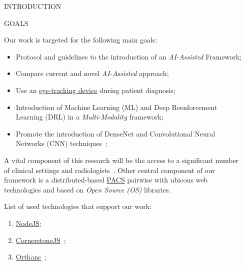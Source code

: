 \documentclass[final]{beamer}
\begin{document}
\begin{frame}[t, fragile = singleslide]{}
\begin{columns}[t]
\begin{column}{0.45\textwidth}
\begin{block}{INTRODUCTION}
\end{block}

\begin{block}{GOALS}

Our work is targeted for the following main goals:

\begin{itemize}
\item Protocol and guidelines to the introduction of an {\it AI-Assisted} Framework;
\item Compare current and novel {\it AI-Assisted} approach;
\item Use an \hyperlink{https://gaming.tobii.com/products/}{eye-tracking device} during patient diagnosis;
\item Introduction of Machine Learning (ML) and Deep Reenforcement Learning (DRL) in a {\it Multi-Modality} framework;
\item Promote the introduction of DenseNet and Convolutional Neural Networks (CNN) techniques~\cite{maicas2017deep};
\end{itemize}

\hfill

A vital component of this research will be the access to a significant number of clinical settings and radiologists~\cite{calisto2017mimbcdui, https://doi.org/10.13140/rg.2.2.16566.14403/1}. Other central component of our framework is a distributed-based \hyperlink{https://www.sciencedirect.com/topics/medicine-and-dentistry/picture-archiving-and-communication-system}{PACS} pairwise with ubicous web technologies and based on \textit{Open Source (OS)} libraries.

\hfill

List of used technologies that support our work:

\hfill

\begin{enumerate}
\item \hyperlink{https://nodejs.org}{NodeJS};
\item \hyperlink{https://cornerstonejs.org/}{CornerstoneJS}~\cite{hostetter2018integration};
\item \hyperlink{https://www.orthanc-server.com/}{Orthanc}~\cite{Jodogne:ISBI2013};
\end{enumerate}

\hfill

\end{block}

\end{column}

\begin{column}{0.45\textwidth}


\end{column}
\end{columns}
\end{frame}
\end{document}
